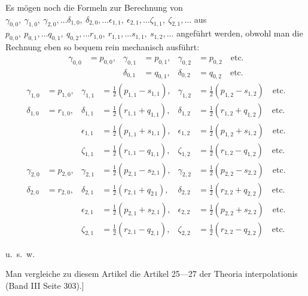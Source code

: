 \begin{landscape}
\par\noindent\hspace*{\parindent}Es mögen noch die Formeln zur Berechnung von \(\gamma_{0,0},\allowbreak\ \gamma_{1,0},\allowbreak\ \gamma_{2,0},\allowbreak\ldots\delta_{1,0},\allowbreak\ \delta_{2,0},\allowbreak\ldots\epsilon_{1,1},\allowbreak\ \epsilon_{2,1},\allowbreak\ldots\zeta_{1,1},\allowbreak\ \zeta_{2,1},\allowbreak\ldots\) aus \(p_{0,0},\allowbreak\ p_{0,1},\allowbreak\ldots q_{0,1},\allowbreak\ q_{0,2},\allowbreak\ldots r_{1,0},\allowbreak\ r_{1,1},\allowbreak\ldots s_{1,1},\allowbreak\ s_{1,2},\allowbreak\ldots\) angeführt werden, obwohl man die Rechnung eben so bequem rein mechanisch ausführt:
\[
\begin{aligned}
\gamma_{0,0}&=p_{0,0},&\gamma_{0,1}&=p_{0,1},&\gamma_{0,2}&=p_{0,2}\quad\text{etc.}\\
&&\delta_{0,1}&=q_{0,1},&\delta_{0,2}&=q_{0,2}\quad\text{etc.}
\end{aligned}
\]
\[
\begin{aligned}
\gamma_{1,0}&=p_{1,0},&\gamma_{1,1}&=\tfrac12(p_{1,1}-s_{1,1}),&\gamma_{1,2}&=\tfrac12(p_{1,2}-s_{1,2})\quad\text{etc.}\\
\delta_{1,0}&=r_{1,0},&\delta_{1,1}&=\tfrac12(r_{1,1}+q_{1,1}),&\delta_{1,2}&=\tfrac12(r_{1,2}+q_{1,2})\quad\text{etc.}\\[8pt]
&&\epsilon_{1,1}&=\tfrac12(p_{1,1}+s_{1,1}),&\epsilon_{1,2}&=\tfrac12(p_{1,2}+s_{1,2})\quad\text{etc.}\\
&&\zeta_{1,1}&=\tfrac12(r_{1,1}-q_{1,1}),&\zeta_{1,2}&=\tfrac12(r_{1,2}-q_{1,2})\quad\text{etc.}\\[8pt]
\gamma_{2,0}&=p_{2,0},&\gamma_{2,1}&=\tfrac12(p_{2,1}-s_{2,1}),&\gamma_{2,2}&=\tfrac12(p_{2,2}-s_{2,2})\quad\text{etc.}\\
\delta_{2,0}&=r_{2,0},&\delta_{2,1}&=\tfrac12(r_{2,1}+q_{2\,1}),&\delta_{2,2}&=\tfrac12(r_{2,2}+q_{2,2})\quad\text{etc.}\\[8pt]
&&\epsilon_{2,1}&=\tfrac12(p_{2,1}+s_{2,1}),&\epsilon_{2,2}&=\tfrac12(p_{2,2}+s_{2,2})\quad\text{etc.}\\
&&\zeta_{2,1}&=\tfrac12(r_{2,1}-q_{2,1}),&\zeta_{2,2}&=\tfrac12(r_{2,2}-q_{2,2})\quad\text{etc.}
\end{aligned}
\]
\begin{center}u.~s.~w.\end{center}
\par\noindent\hspace*{\parindent}Man vergleiche zu diesem Artikel die Artikel 25---27 der Theoria interpolationis (Band III Seite 303).]
\clearpage
\endgroup
\end{landscape}
